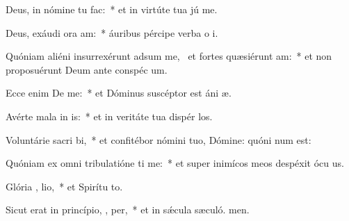 \item Deus, in nómine tu   fac:~* et in virtúte tua jú me.
\item Deus, exáudi ora am:~* áuribus pércipe verba o i.
\item Quóniam aliéni insurrexérunt adsum me,~\pscross{} et fortes quæsiérunt  am:~* et non proposuérunt Deum ante conspéc um.
\item Ecce enim De  me:~* et Dóminus suscéptor est áni æ.
\item Avérte mala in is:~* et in veritáte tua dispér los.
\item Voluntárie sacri bi,~* et confitébor nómini tuo, Dómine: quóni num est:
\item Quóniam ex omni tribulatióne ti me:~* et super inimícos meos despéxit ócu us.
\item Glória ,  lio,~* et Spirítu to.
\item Sicut erat in princípio,  ,  per,~* et in sǽcula sæculó. men.
